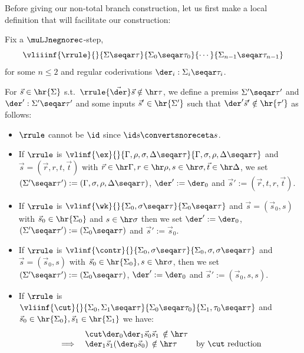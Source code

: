 Before giving our non-total branch construction, let us first make a local definition that will facilitate our construction:
\begin{definition}
    \label{def:refl-non-totality}
    Fix a $\muLJnegnorec$-step,
    \[
    \vliiinf{ \rrule}{}{\Sigma \seqar \tau}{\Sigma_0 \seqar \tau_0}{\cdots}{\Sigma_{n-1} \seqar \tau_{n-1}}
    \] 
    for some $n\leq 2$ and regular coderivations $\der_i:\Sigma_i\seqar \tau_i$. 
    
    For $\vec s \in \hr{\Sigma}$ s.t.\ $ \rrule {\vec \der} \vec s \notin \hr \tau$,
    we define a premiss $\Sigma' \seqar \tau'$ and $\der':\Sigma'\seqar \tau'$ and some inputs $\vec s' \in \hr{ \Sigma'}$ such that $\der'\vec s'
    \notin \hr{\tau'}$
    as follows:
\begin{itemize} 
\item $\rrule $ cannot be $\id$ since $\id s \convertsnoreceta s$.
\item If $\rrule $ is $\vlinf{\ex}{}{\Gamma, \rho, \sigma, \Delta \seqar \tau}{\Gamma , \sigma, \rho , \Delta \seqar \tau}$ and $\vec s = (\vec r, r , t,\vec t)$ with $\vec r \in \hr \Gamma, r\in \hr \rho , s \in \hr \sigma, \vec t \in \hr \Delta$, we set $(\Sigma'\seqar \tau'):= (\Gamma, \sigma, \rho, \Delta \seqar \tau)$, $\der':=\der_0$ and $\vec s':= (\vec r,t,r,\vec t)$.
\item If $\rrule $ is $\vlinf{\wk}{}{\Sigma_0,\sigma \seqar \tau}{\Sigma_0 \seqar \tau}$ and $\vec s = (\vec s_0,s) $ with $\vec s_0 \in \hr{\Sigma_0}$ and $s \in \hr \sigma$ then we set $\der':= \der_0$, $(\Sigma'\seqar \tau'):= (\Sigma_0 \seqar \tau)$ and $\vec s' := \vec s_0$. 
\item If $\rrule $ is $\vlinf{\contr}{}{\Sigma_0 , \sigma\seqar \tau}{\Sigma_0, \sigma, \sigma \seqar \tau}$ and $\vec s = (\vec s_0,s)$ with $\vec s_0 \in \hr {\Sigma_0}, s\in \hr \sigma$, then we set $(\Sigma' \seqar \tau'):= \allowbreak (\Sigma_0\seqar \tau)$, $\der':= \der_0$ and $\vec s' := (\vec s_0,s,s)$.
\item If $\rrule $ is 
\(
\vliinf{\cut}{}{\Sigma_0,\Sigma_1 \seqar \tau}{\Sigma_0 \seqar \tau_0}{\Sigma_1, \tau_0 \seqar \tau }
\)
and $\vec s_0 \in \hr{\Sigma_0}, \vec s_1 \in \hr{\Sigma_1}$ we have:
\[
\begin{array}{rll}
     & \cut \der_0 \der_1 \vec s_0 \vec s_1\, \notin \hr\tau \\
     \implies & \der_1  \vec s_1 (\der_0 \vec s_0) \, \notin \hr \tau & \text{by $\cut$ reduction}
\end{array}
\]
\end{itemize}
\end{definition}
